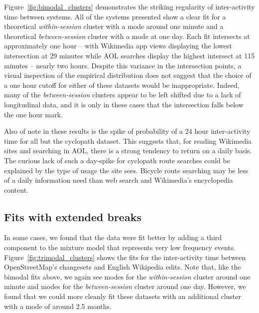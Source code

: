 Figure~\ref{fig:bimodal_clusters} demonstrates the striking regularity of inter-activity time between systems.  All of the systems presented show a clear fit for a theoretical \emph{within-session} cluster with a mode around one minute and a theoretical \emph{between-session} cluster with a mode at one day.  Each fit intersects at approximately one hour -- with Wikimedia app views displaying the lowest intersection at 29 minutes while AOL searches display the highest intersect at 115 minutes -- nearly two hours.   Despite this variance in the intersection points, a visual inspection of the empirical distribution does not suggest that the choice of a one hour cutoff for either of these datasets would be inappropriate.  Indeed, many of the \emph{between-session} clusters appear to be left shifted due to a lack of longitudinal data, and it is only in these cases that the intersection falls below the one hour mark.

Also of note in these results is the spike of probability of a 24 hour inter-activity time for all but the cyclopath dataset.  This suggests that, for reading Wikimedia sites and searching in AOL, there is a strong tendency to return on a daily basis.  The curious lack of such a day-spike for cyclopath route searches could be explained by the type of usage the site sees. Bicycle route searching may be less of a daily information need than web search and Wikimedia's encyclopedia content.

\subsection{Fits with extended breaks}

In some cases, we found that the data were fit better by adding a third component to the mixture model that represents very low frequency events.  Figure~\ref{fig:trimodal_clusters} shows the fits for the inter-activity time between OpenStreetMap's changesets and English Wikipedia edits.  Note that, like the bimodal fits above, we again see modes for the \emph{within-session} cluster around one minute and modes for the \emph{between-session} cluster around one day.  However, we found that we could more cleanly fit these datasets with an additional cluster with a mode of around 2.5 months.

